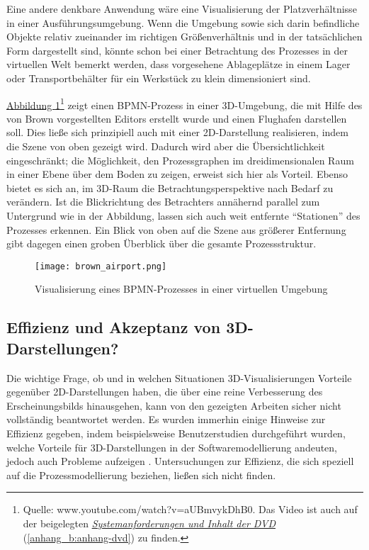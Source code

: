 \documentclass[a4paper,10pt]{sphinxmanual}
\begin{document}
Eine andere denkbare Anwendung wäre eine Visualisierung der Platzverhältnisse in einer Ausführungsumgebung.
Wenn die Umgebung sowie sich darin befindliche Objekte relativ zueinander im richtigen Größenverhältnis und in der tatsächlichen Form dargestellt sind, könnte schon bei einer Betrachtung des Prozesses in der virtuellen Welt bemerkt werden, dass vorgesehene Ablageplätze in einem Lager oder Transportbehälter für ein Werkstück zu klein dimensioniert sind.

\hyperref[related:brown-airport]{Abbildung  \ref*{related:brown-airport}}\footnote{
Quelle: www.youtube.com/watch?v=aUBmvykDhB0. Das Video ist auch auf der beigelegten {\hyperref[anhang_b:anhang-dvd]{\emph{Systemanforderungen und Inhalt der DVD}}} (\autoref*{anhang_b:anhang-dvd}) zu finden.
} zeigt einen BPMN-Prozess in einer 3D-Umgebung, die mit Hilfe des von Brown vorgestellten Editors erstellt wurde und einen Flughafen darstellen soll.
Dies ließe sich prinzipiell auch mit einer 2D-Darstellung realisieren, indem die Szene von oben gezeigt wird.
Dadurch wird aber die Übersichtlichkeit eingeschränkt; die Möglichkeit, den Prozessgraphen im dreidimensionalen Raum in einer Ebene über dem Boden zu zeigen, erweist sich hier als Vorteil.
Ebenso bietet es sich an, im 3D-Raum die Betrachtungsperspektive nach Bedarf zu verändern.
Ist die Blickrichtung des Betrachters annähernd parallel zum Untergrund wie in der Abbildung, lassen sich auch weit entfernte "`Stationen"' des Prozesses erkennen.
Ein Blick von oben auf die Szene aus größerer Entfernung gibt dagegen einen groben Überblick über die gesamte Prozessstruktur.
\begin{figure}[htbp]
\centering
\capstart

\texttt{[image: brown\_airport.png]}
\caption{Visualisierung eines BPMN-Prozesses in einer virtuellen Umgebung}\label{related:brown-airport}\end{figure}


\subsection{Effizienz und Akzeptanz von 3D-Darstellungen?}
\label{related:effizienz-und-akzeptanz-von-3d-darstellungen}
Die wichtige Frage, ob und in welchen Situationen 3D-Visualisierungen Vorteile gegenüber 2D-Darstellungen haben, die über eine reine Verbesserung des Erscheinungsbilds hinausgehen,  kann von den gezeigten Arbeiten sicher nicht vollständig beantwortet werden.
Es wurden immerhin einige Hinweise zur Effizienz gegeben, indem beispielsweise Benutzerstudien durchgeführt wurden, welche Vorteile für 3D-Darstellungen in der Softwaremodellierung andeuten, jedoch auch Probleme aufzeigen \cite{dwyer_three_2001} \cite{mcintosh_x3d-uml:_2008} \cite{halpin_exploring_2008}.
Untersuchungen zur Effizienz, die sich speziell auf die Prozessmodellierung beziehen, ließen sich nicht finden.
\end{document}
